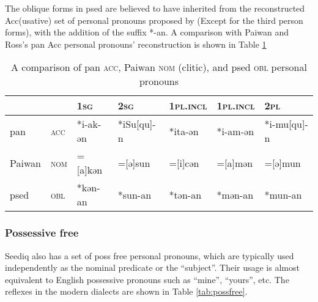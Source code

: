 The oblique forms in \acl{psed} are believed to have inherited from the reconstructed Acc(usative) set of personal pronouns proposed by \textcite{ross2006casepronoun} (Except for the third person forms), with the addition of the suffix *-an. A comparison with Paiwan and Ross's \acs{pan} Acc personal pronouns' reconstruction is shown in Table \ref{tab:panacc}

\begin{table}[!htbp]
\centering
\caption{A comparison of \acs{pan} \textsc{acc}, Paiwan \textsc{nom} (clitic), and \acl{psed} \textsc{obl} personal pronouns}
\label{tab:panacc}
\begin{tabular}{lllllll}
\hline
       &     & \textsc{1sg}      & \textsc{2sg}        & \textsc{1pl.incl} & \textsc{1pl.incl} & \textsc{2pl}         \\\hline
\acs{pan}   & \textsc{acc} & *i-ak-ən & *iSu[qu]-n & *ita-ən  & *i-am-ən & *i-mu[qu]-n \\
Paiwan & \textsc{nom} & =[a]kən  & =[ə]sun    & =[i]cən  & =[a]mən  & =[ə]mun     \\
\acl{psed} & \textsc{obl} & *kən-an  & *sun-an    & *tən-an  & *mən-an  & *mun-an    \\ \hline
\end{tabular}
\end{table}

\subsubsection{Possessive free}

Seediq also has a set of \acl{poss} free personal pronouns, which are typically used independently as the nominal predicate or the ``subject''. Their usage is almost equivalent to English possessive pronouns such as ``mine'', ``yours'', etc. The reflexes in the modern dialects are shown in Table \ref{tab:possfree}.

